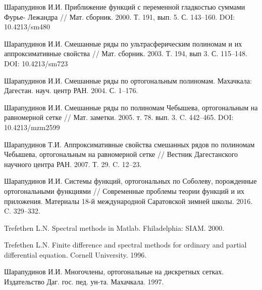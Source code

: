 \begin{thebibliography}{999}

 Шарапудинов И.И. Приближение функций с переменной гладкостью суммами Фурье- Лежандра // Мат. сборник. 2000. Т. 191, вып. 5. С. 143--160. DOI: 10.4213/sm480




 Шарапудинов И.И. Смешанные ряды по ультрасферическим полиномам и их аппроксимативные свойства // Мат. сборник. 2003. Т. 194, вып 3. С. 115--148. DOI: 10.4213/sm723




 Шарапудинов И.И. Смешанные ряды по ортогональным полиномам. Махачкала: Дагестан. науч. центр РАН. 2004. С. 1--176.




 Шарапудинов И.И. Смешанные ряды по полиномам Чебышева, ортогональным на равномерной сетке // Мат. заметки. 2005. т. 78. вып. 3. C. 442--465. DOI: 10.4213/mzm2599




 Шарапудинов Т.И. Аппроксимативные свойства смешанных рядов по полиномам Чебышева, ортогональным на равномерной сетке // Вестник Дагестанского научного центра РАН. 2007. Т. 29. C. 12--23.




 Шарапудинов И.И. Системы функций, ортогональных по Соболеву, порожденные ортогональными функциями // Современные проблемы теории функций и их приложения. Материалы 18-й международной Саратовской зимней школы. 2016. C. 329--332.




 Trefethen L.N. Spectral methods in Matlab. Fhiladelphia: SIAM. 2000.




 Trefethen L.N. Finite difference and spectral methods for ordinary and partial differential equation. Cornell University. 1996.




 Шарапудинов И.И. Многочлены, ортогональные на дискретных сетках. Издательство Даг. гос. пед. ун-та. Махачкала. 1997.




\end{thebibliography}
